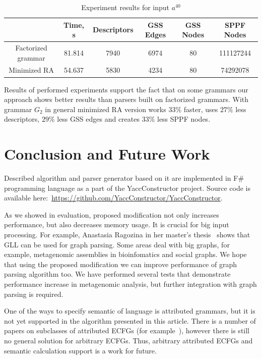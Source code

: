 \documentclass[runningheads,a4paper]{llncs}
\begin{document}
\begin{table}[ht]   
\begin{center}
    \begin{tabular}{ | c | c | c | c | c | c | }
        \hline
                           & Time, s & Descriptors & GSS Edges & GSS Nodes & SPPF Nodes   \\ \hline
        Factorized grammar & 81.814  & 7940        & 6974      & 80        & 111127244  \\ \hline
        Minimized RA       & 54.637  & 5830        & 4234      & 80        & 74292078  \\ \hline
    \end{tabular}
\end{center}
\caption{Experiment results for input $a^{40}$}
\label{expTable}
\end{table}



Results of performed experiments support the fact that on some grammars our approach shows better results than parsers built on factorized grammars.
With grammar $G_2$ in general minimized RA version works $33\%$ faster, uses $27\%$ less descriptors, $29\%$ less GSS edges and creates $33\%$ less SPPF nodes.

\section{Conclusion and Future Work}

Described algorithm and parser generator based on it are implemented in F\# programming language as a part of the YaccConstructor project.
Source code is available here:~\url{https://github.com/YaccConstructor/YaccConstructor}.

As we showed in evaluation, proposed modification not only increases performance, but also decreases memory usage. 
It is crucial for big input processing.
For example, Anastasia Ragozina in her master's thesis~\cite{ragozina} shows that GLL can be used for graph parsing.  
Some areas deal with big graphs, for example, metagenomic assemblies in bioinfomatics and social graphs.
We hope that using the proposed modification we can improve performance of graph parsing algorithm too. 
We have performed several tests that demonstrate performance increase in metagenomic analysis, but further integration with graph parsing is required.

One of the ways to specify semantic of language is attributed grammars, but it is not yet supported in the algorithm presented in this article.
There is a number of papers on subclasses of attributed ECFGs (for example~\cite{AttributedELL}), however there is still no general solution for arbitrary ECFGs.
Thus, arbitrary attributed ECFGs and semantic calculation support is a work for future.
\end{document}
